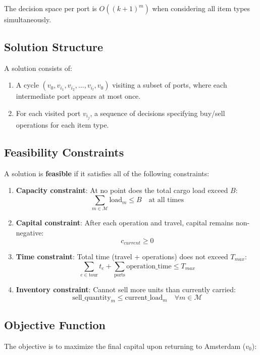 \documentclass[12pt]{article}
\begin{document}
The decision space per port is $O((k+1)^m)$ when considering all item types simultaneously.

\subsection{Solution Structure}

A solution consists of:
\begin{enumerate}
    \item A cycle $(v_0, v_{i_1}, v_{i_2}, ..., v_{i_l}, v_0)$ visiting a subset of ports, where each intermediate port appears at most once.
    \item For each visited port $v_{i_j}$, a sequence of decisions specifying buy/sell operations for each item type.
\end{enumerate}

\subsection{Feasibility Constraints}

A solution is \textbf{feasible} if it satisfies all of the following constraints:

\begin{enumerate}
    \item \textbf{Capacity constraint}: At no point does the total cargo load exceed $B$:
    $$\sum_{m \in \mathcal{M}} \text{load}_m \leq B \quad \text{at all times}$$
    
    \item \textbf{Capital constraint}: After each operation and travel, capital remains non-negative:
    $$c_{current} \geq 0$$
    
    \item \textbf{Time constraint}: Total time (travel + operations) does not exceed $T_{max}$:
    $$\sum_{e \in \text{tour}} t_e + \sum_{\text{ports}} \text{operation\_time} \leq T_{max}$$
    
    \item \textbf{Inventory constraint}: Cannot sell more units than currently carried:
    $$\text{sell\_quantity}_m \leq \text{current\_load}_m \quad \forall m \in \mathcal{M}$$
\end{enumerate}

\subsection{Objective Function}

The objective is to maximize the final capital upon returning to Amsterdam ($v_0$):
\end{document}
